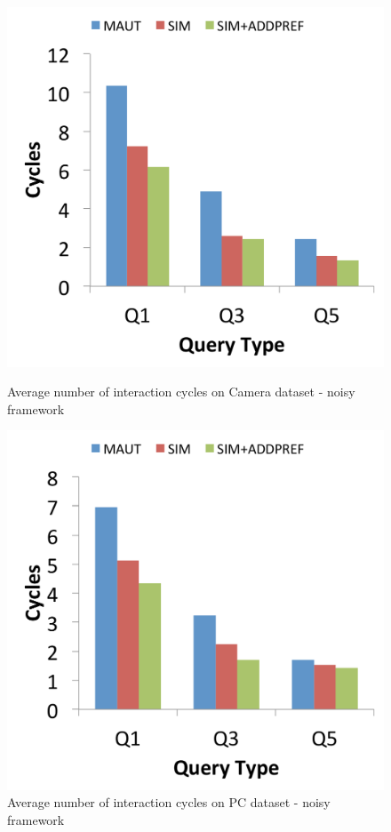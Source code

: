 \begin{figure}[h]
\centering
\begin{minipage}{.45\textwidth}
  \centering
  \includegraphics[width=1\linewidth]{figures-bharath/sim_camera_noisy}
  \caption[]{Average number of interaction cycles on Camera dataset - noisy framework}
  \label{fig:sim_camera_noisy}
\end{minipage}%
\;\;\;\;\;\;
\begin{minipage}{.45\textwidth}
  \centering
  \includegraphics[width=1\linewidth]{figures-bharath/sim_pc_noisy}
  \caption[]{Average number of interaction cycles on PC dataset - noisy framework}
  \label{fig:sim_pc_noisy}
\end{minipage}
\end{figure}





